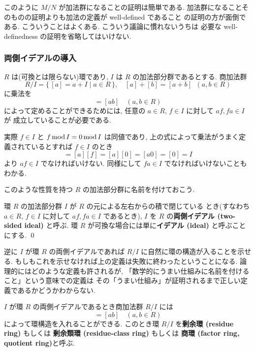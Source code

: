 \documentclass[12pt,twoside]{jarticle}
\begin{document}
このように $M/N$ が加法群になることの証明は簡単である.
加法群になることそのものの証明よりも加法の定義が well-defined であること
の証明の方が面倒である. こういうことはよくある. 
こういう議論に慣れないうちは
必要な well-definedness の証明を省略してはいけない.

\subsubsection{両側イデアルの導入}

$R$ は(可換とは限らない)環であり, $I$ は $R$ の加法部分群であるとする.
商加法群
\begin{equation*}
 R/I=\{\,[a]=a+I\mid a\in R\,\}, \quad
 [a]+[b] = [a+b] \;\; (a,b\in R)
\end{equation*}
に乗法を
\begin{equation*}
 [a][b]=[ab] \quad (a,b\in R)
\end{equation*}
によって定めることができるためには, 
任意の $a\in R$, $f\in I$ に対して $af, fa\in I$ が
成立していることが必要である. 

実際 $f\in I$ と $f\mathop{\mathrm{mod}}\nolimits I=0\mathop{\mathrm{mod}}\nolimits I$ は同値であり, 
上の式によって乗法がうまく定義されているとすれば $f\in I$ のとき
\begin{equation*}
 [af] = [a][f] = [a][0] = [a0] = [0] = I
\end{equation*}
より $af\in I$ でなければいけない. 
同様にして $fa\in I$ でなければいけないこともわかる.

このような性質を持つ $R$ の加法部分群に名前を付けておこう.

\begin{definition}
 環 $R$ の加法部分群 $I$ が $R$ の元による左右からの積で閉じている
 とき(すなわち $a\in R$, $f\in I$ に対して $af, fa\in I$ であるとき), 
 $I$ を $R$ の{\bf 両側イデアル (two-sided ideal)} と呼ぶ.
 環 $R$ が可換な場合には単に{\bf イデアル (ideal)} と呼ぶことにする.
 \qed
\end{definition}

逆に $I$ が環 $R$ の両側イデアルであれば %
$R/I$ に自然に環の構造が入ることを示せる.
もしもこれを示せなければ上の定義は失敗に終わったということになる.
論理的にはどのような定義も許されるが, 
「数学的にうまい仕組みに名前を付けること」という意味での定義は
その「うまい仕組み」が証明されるまで正しい定義であるかどうかわからない. 

\begin{theorem}[剰余環]
 $I$ が環 $R$ の両側イデアルであるとき商加法群 $R/I$ には
 \begin{equation*}
  [a][b]=[ab] \quad (a,b\in R)
 \end{equation*}
 によって環構造を入れることができる.
 このとき環 $R/I$ を{\bf 剰余環 (residue ring)} もしくは
 {\bf 剰余類環 (residue-class ring)} もしくは
 {\bf 商環 (factor ring, quotient ring)}と呼ぶ.
\end{theorem}
\end{document}
